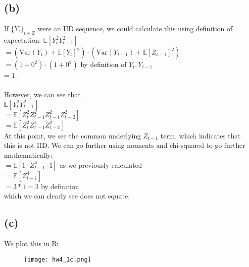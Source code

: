\documentclass{article}
\begin{document}
{\subsection*{(b)}

If $\{Y_t\}_{t \in \mathbb{Z}}$ were an IID sequence, we could calculate this using definition of expectation:
$\mathbb{E}[Y_t^2Y_{t-1}^2]$ \\ 
$= (\text{Var}(Y_t) + \mathbb{E}[Y_t]^2) \cdot (\text{Var}(Y_{t-1}) + \mathbb{E}[Z_{t-1}]^2)$ \\
$= (1 + 0^2) \cdot (1 + 0^2)$ \hfill by definition of $Y_t, Y_{t-1}$ \\ 
= 1. \\ \\ 
However, we can see that \\
$\mathbb{E}[Y_t^2Y_{t-1}^2]$ \\
$= \mathbb{E}[Z_t^2Z_{t-1}^2Z_{t-1}^2Z_{t-2}^2]$ \\
$= \mathbb{E}[Z_t^2Z_{t-1}^4Z_{t-2}^2]$ \\
At this point, we see the common underlying $Z_{t-1}$ term, which indicates that this is not IID.  We can go further using moments and chi-squared to go further mathematically: \\ 
$= \mathbb{E}[1 \cdot Z_{t-1}^4 \cdot 1]$ \hfill as we previously calculated \\
$= \mathbb{E}[Z_{t-1}^4]$ \\ 
$= 3 * 1 = 3$ \hfill by definition \\ 
which we can clearly see does not equate. 

\newpage

\subsection*{(c)}

We plot this in R: 
\begin{figure}[h!]
  \centering
  \texttt{[image: hw4\_1c.png]}
\end{figure}

\newpage

}
\end{document}
